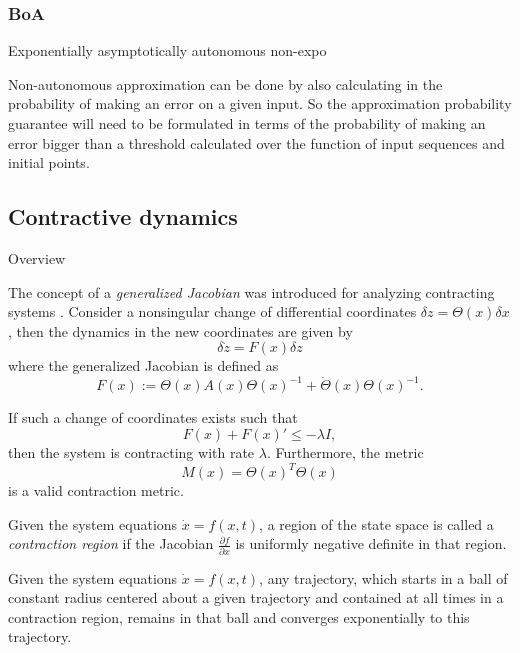 \documentclass{article}
\newcounter{ct}
\begin{document}
\subsubsection{BoA}
Exponentially asymptotically autonomous  \citep{giesl2011numerical}
non-expo  \citep{giesl2012numerical}

Non-autonomous approximation can be done by also calculating in the probability of making an error on a given input.
So the approximation probability guarantee will need to be formulated in terms of the probability of making an error bigger than a threshold calculated over the function of input sequences and initial points.




\subsection{Contractive dynamics}\label{sec:contractive}

Overview  \citep{aminzare2014contraction, tsukamoto2021contraction}

The concept of a \textit{generalized Jacobian} was introduced for analyzing contracting systems  \citep{lohmiller1998contraction}.
Consider a nonsingular change of differential coordinates \( \delta z = \Theta(x) \delta x \), then the dynamics in the new coordinates are given by
\[
\delta\dot{ z} = F(x) \delta z
\]
where the generalized Jacobian is defined as
\[
F(x) := \Theta(x) A(x) \Theta(x)^{-1} + \dot{\Theta}(x) \Theta(x)^{-1}.
\]

If such a change of coordinates exists such that
\[
F(x) + F(x)' \leq -\lambda I,
\]
then the system is contracting with rate \( \lambda \). Furthermore, the metric
\[
M(x) = \Theta(x)^T \Theta(x)
\]
is a valid contraction metric.

\begin{definition}
Given the system equations \(\dot{x} = f(x, t)\), a region of the state space is called a \textit{contraction region} if the Jacobian \(\frac{\partial f}{\partial x}\) is uniformly negative definite in that region.
\end{definition}

\begin{theorem}\label{thrm:contractive_ball}
Given the system equations  $\dot x = f(x, t)$, any trajectory, which starts in a ball of constant radius centered about a given trajectory and contained at all times in a contraction region, remains in that ball and converges exponentially to this trajectory.
\end{theorem}
\end{document}
